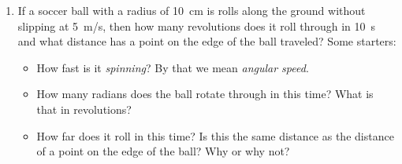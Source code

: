 \begin{enumerate}





%

\item If a soccer ball with a radius of \SI{10}{\centi\meter} is rolls along the ground without slipping at \SI{5}{m/s}, then how many revolutions does it roll through in \SI{10}{\second} and what distance has a point on the edge of the ball traveled?
Some starters:
\begin{itemize}
	\item How fast is it \emph{spinning}? By that we mean \emph{angular speed}.
	\item How many radians does the ball rotate through in this time? What is that in revolutions?
	\item How far does it roll in this time? Is this the same distance as the distance of a point on the edge of the ball? Why or why not?
\end{itemize}
\hugeskip


\end{enumerate}
